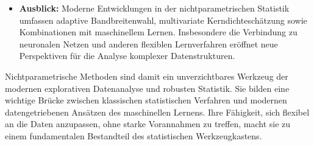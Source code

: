 \documentclass[a4paper, 11pt]{scrartcl}
\newif\ifshowtext
\begin{document}
\begin{itemize}
	\item \textbf{Ausblick:} Moderne Entwicklungen in der nichtparametrischen Statistik umfassen adaptive Bandbreitenwahl, multivariate Kerndichteschätzung sowie Kombinationen mit maschinellem Lernen. Insbesondere die Verbindung zu neuronalen Netzen und anderen flexiblen Lernverfahren eröffnet neue Perspektiven für die Analyse komplexer Datenstrukturen.
\end{itemize}

Nichtparametrische Methoden sind damit ein unverzichtbares Werkzeug der modernen explorativen Datenanalyse und robusten Statistik. Sie bilden eine wichtige Brücke zwischen klassischen statistischen Verfahren und modernen datengetriebenen Ansätzen des maschinellen Lernens. Ihre Fähigkeit, sich flexibel an die Daten anzupassen, ohne starke Vorannahmen zu treffen, macht sie zu einem fundamentalen Bestandteil des statistischen Werkzeugkastens.

\ifshowtext
\printbibliography
\fi
	
\end{document}

